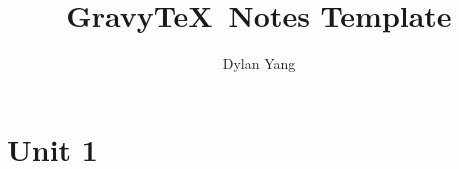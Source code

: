 \documentclass[nodate]{gravyreprt}
\title{Gravy\TeX\ Notes Template}
\author{Dylan Yang}
\begin{document}
\maketitle

\tableofcontents

\chapter{Unit 1}



\end{document}
